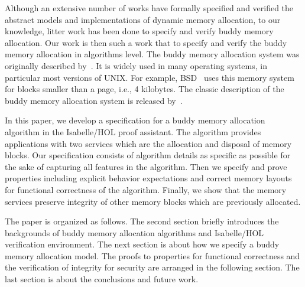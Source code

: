 Although an extensive number of works have formally specified and verified the abstract models and implementations of dynamic memory allocation, to our knowledge, litter work has been done to specify and verify buddy memory allocation. Our work is then such a work that to specify and verify the buddy memory allocation in algorithms level. The buddy memory allocation system was originally described by~\cite{reg_knowlton}. It is widely used in many operating systems, in particular most versions of UNIX. For example, BSD~\cite{reg_mckusick} uses this memory system for blocks smaller than a page, i.e., 4 kilobytes. The classic description of the buddy memory allocation system is released by~\cite{reg_knuth}.

In this paper, we develop a specification for a buddy memory allocation algorithm in the Isabelle/HOL proof assistant. The algorithm provides applications with two services which are the allocation and disposal of memory blocks. Our specification consists of algorithm details as specific as possible for the sake of capturing all features in the algorithm. Then we specify and prove properties including explicit behavior expectations and correct memory layouts for functional correctness of the algorithm. Finally, we show that the memory services preserve integrity of other memory blocks which are previously allocated.

The paper is organized as follows. The second section briefly introduces the backgrounds of buddy memory allocation algorithms and Isabelle/HOL verification environment. The next section is about how we specify a buddy memory allocation model. The proofs to properties for functional correctness and the verification of integrity for security are arranged in the following section. The last section is about the conclusions and future work.
